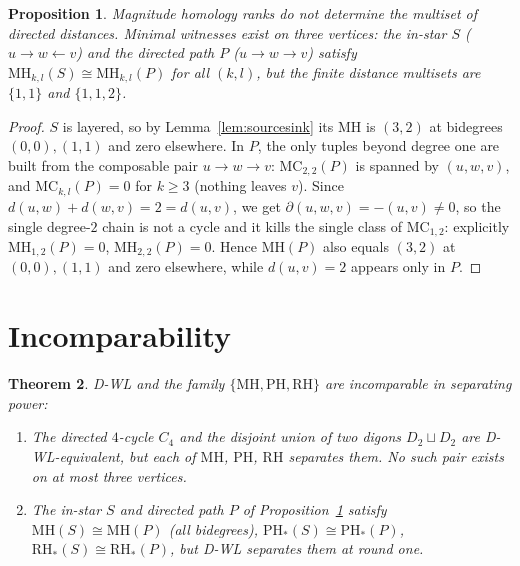 \documentclass[pdflatex,sn-mathphys,Numbered]{sn-jnl}
\theoremstyle{thmstyleone}
\newtheorem{theorem}{Theorem}[section]
\newtheorem{proposition}[theorem]{Proposition}
\theoremstyle{thmstyletwo}
\newcommand{\MH}{\mathrm{MH}}
\newcommand{\PH}{\mathrm{PH}}
\newcommand{\RH}{\mathrm{RH}}
\newcommand{\MC}{\mathrm{MC}}
\begin{document}
\begin{proposition}\label{prop:mhnotdist}
Magnitude homology ranks do not determine the multiset of directed
distances. Minimal witnesses exist on three vertices: the in-star
$S$ ($u \to w \leftarrow v$) and the directed path
$P$ ($u \to w \to v$) satisfy $\MH_{k,l}(S) \cong \MH_{k,l}(P)$ for all
$(k,l)$, but the finite distance multisets are $\{1,1\}$ and
$\{1,1,2\}$.
\end{proposition}

\begin{proof}
$S$ is layered, so by Lemma~\ref{lem:sourcesink} its $\MH$ is
$(3, 2)$ at bidegrees $(0,0), (1,1)$ and zero elsewhere. In $P$, the only
tuples beyond degree one are built from the composable pair
$u \to w \to v$: $\MC_{2,2}(P)$ is spanned by $(u,w,v)$, and
$\MC_{k,l}(P) = 0$ for $k \ge 3$ (nothing leaves $v$). Since
$d(u,w) + d(w,v) = 2 = d(u,v)$, we get
$\partial(u,w,v) = -(u,v) \ne 0$, so the single degree-$2$ chain is not a
cycle and it kills the single class of $\MC_{1,2}$: explicitly
$\MH_{1,2}(P) = 0$, $\MH_{2,2}(P) = 0$. Hence $\MH(P)$ also equals
$(3,2)$ at $(0,0), (1,1)$ and zero elsewhere, while $d(u,v) = 2$ appears
only in $P$.
\end{proof}

\section{Incomparability}\label{sec:incomparable}

\begin{theorem}\label{thm:incomparable}
D-WL and the family $\{\MH, \PH, \RH\}$ are incomparable in separating
power:
\begin{enumerate}
\item[(a)] The directed $4$-cycle $C_4$ and the disjoint union of two
digons $D_2 \sqcup D_2$ are D-WL-equivalent, but each of $\MH$, $\PH$,
$\RH$ separates them. No such pair exists on at most three vertices.
\item[(b)] The in-star $S$ and directed path $P$ of
Proposition~\ref{prop:mhnotdist} satisfy
$\MH(S) \cong \MH(P)$ (all bidegrees), $\PH_\ast(S) \cong \PH_\ast(P)$,
$\RH_\ast(S) \cong \RH_\ast(P)$, but D-WL separates them at round one.
\end{enumerate}
\end{theorem}
\end{document}
